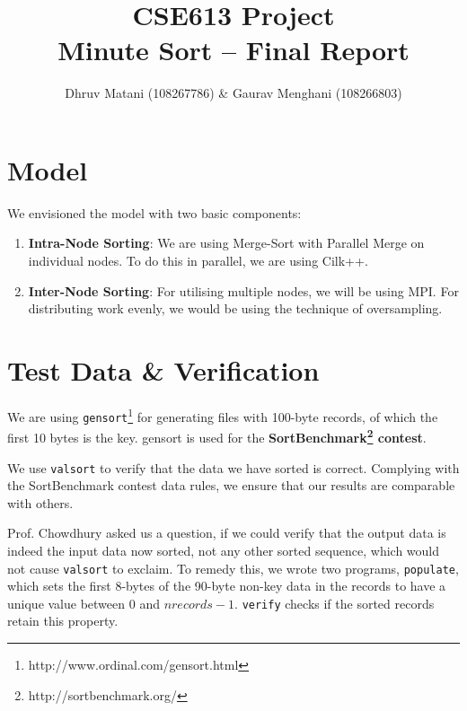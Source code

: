 \documentclass{article}
\title{CSE613 Project\\Minute Sort -- Final Report}
\author{Dhruv Matani (108267786) \& Gaurav Menghani (108266803)}
\begin{document}
\maketitle

\clearpage

\section{Model}
We envisioned the model with two basic components:
\begin{enumerate}
\item {\bf{Intra-Node Sorting}}: We are using Merge-Sort with Parallel Merge on individual nodes. To do this in parallel, 
we are using Cilk++. 

\item {\bf{Inter-Node Sorting}}: For utilising multiple nodes, we will be using MPI. For distributing work evenly, 
we would be using the technique of oversampling.
\end{enumerate}

\section{Test Data \& Verification}
We are using \verb#gensort#\footnote{http://www.ordinal.com/gensort.html} for generating files with 100-byte records, 
of which the first 10 bytes is the key. gensort is used for the {\bf SortBenchmark\footnote{http://sortbenchmark.org/} contest}.

We use \verb#valsort# to verify that the data we have sorted is correct. Complying with the SortBenchmark contest data rules, we ensure that our results are comparable with others.

Prof. Chowdhury asked us a question, if we could verify that the output data is indeed the input data now sorted, not
any other sorted sequence, which would not cause \verb#valsort# to exclaim. To remedy this, we wrote two programs, 
\verb#populate#, which sets the first 8-bytes of the 90-byte non-key data in the records to have a unique value between 
$0$ and $nrecords-1$.
\verb#verify# checks if the sorted records retain this property. 
\end{document}
